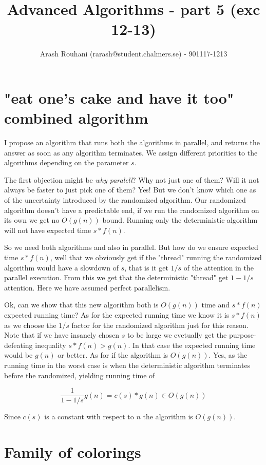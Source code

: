 \documentclass[a4paper,11pt]{article}
\title{Advanced Algorithms - part 5 (exc 12-13)}
\author{Arash Rouhani (rarash@student.chalmers.se) - 901117-1213}
\begin{document}
\maketitle

\section{"eat one's cake and have it too" combined algorithm}

I propose an algorithm that runs both the algorithms in parallel,
and returns the answer as soon as any algorithm terminates.
We assign different priorities to the algorithms depending on
the parameter $s$.

The first objection might be \emph{why paralell}? Why not just
one of them? Will it not always be faster to just pick one of them?
Yes! But we don't know which one as of the uncertainty introduced
by the randomized algorithm.
Our randomized algorithm
doesn't have a predictable end, if we run the randomized algorithm
on its own we get no $O(g(n))$ bound. Running only the deterministic
algorithm will not have expected time $s*f(n)$.

So we need both algorithms and also in parallel.
But how do we ensure expected time $s*f(n)$, well
that we obviously get if the "thread" running the randomized
algorithm would have a slowdown of $s$, that is it get
$1/s$ of the attention in the parallel execution.
From this we get that the deterministic "thread" get
$1-1/s$ attention. Here we have assumed
perfect parallelism.

Ok, can we show that this new algorithm both is $O(g(n))$ time and
$s*f(n)$ expected running time? As for the expected running time
we know it is $s*f(n)$ as we choose the $1/s$ factor for
the randomized algorithm just for this reason. Note that if
we have insanely chosen $s$ to be large we evetually
get the purpose-defeating inequality $s*f(n) > g(n)$.
In that case the expected running time would be $g(n)$ or better.
As for if the algorithm is $O(g(n))$. Yes, as the running
time in the worst case is when the deterministic algorithm terminates
before the randomized, yielding running time of

\[
\frac{1}{1-1/s}g(n) = c(s)*g(n) \in O(g(n))
\]

Since $c(s)$ is a constant with respect to $n$ the
algorithm is $O(g(n))$.

\section{Family of colorings}
\end{document}
